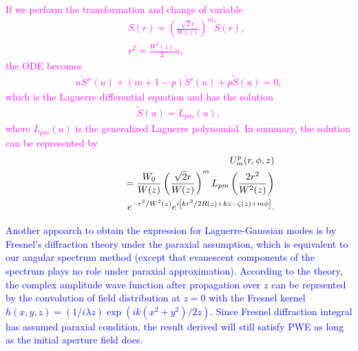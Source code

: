 \textcolor{magenta}{If we perform the transformation and change of variable
\begin{eqnarray}
	&&S(r) = \left(\frac{\sqrt{2}r}{W(z)}\right)^{m} \tilde{S}(r),
	\nonumber\\
	&&r^2 = \frac{W^2(z)}{2} u,
	\nonumber
\end{eqnarray}
the ODE becomes
\begin{eqnarray}
	u \tilde{S}''(u) + (m + 1 - p)\tilde{S}'(u) + p\tilde{S}(u) = 0,
\end{eqnarray}
which is the Laguerre differential equation and has the solution
\begin{eqnarray}
	\tilde{S}(u) = L_{pm}(u),
\end{eqnarray}
where $L_{pm}(u)$ is the generalized Laguerre polynomial. In summary, the solution can be represented by
\begin{eqnarray}
	&&U^{p}_{m}(r, \phi, z)
	\nonumber\\
	&&= \frac{W_0}{W(z)} \left(\frac{\sqrt{2} r}{W(z)}\right)^{m} L_{pm}\left(\frac{2 r^2}{W^2(z)}\right)
	\nonumber\\
	&&\hspace{0.5in} e^{-r^2/W^2(z)}  e^{i \left[k r^2/ 2 R(z) + kz - \zeta(z) + m \phi\right]}.
\end{eqnarray}}

\textcolor{blue}{
Another appoarch to obtain the expression for Laguerre-Gaussian modes is by Fresnel's diffraction theory under the paraxial assumption, which is equivalent to our angular spectrum method (except that evanescent components of the spectrum plays no role under paraxial approximation). According to the theory, the complex amplitude wave function after propagation over $z$ can be reprsented by the convolution of field distribution at $z = 0$ with the Fresnel kernel $h(x, y, z) = (1 / i \lambda z) \exp(ik(x^2 + y^2)/2z)$. Since Fresnel diffraction integral has assumed paraxial condition, the result derived will still satisfy PWE as long as the initial aperture field does.
}

